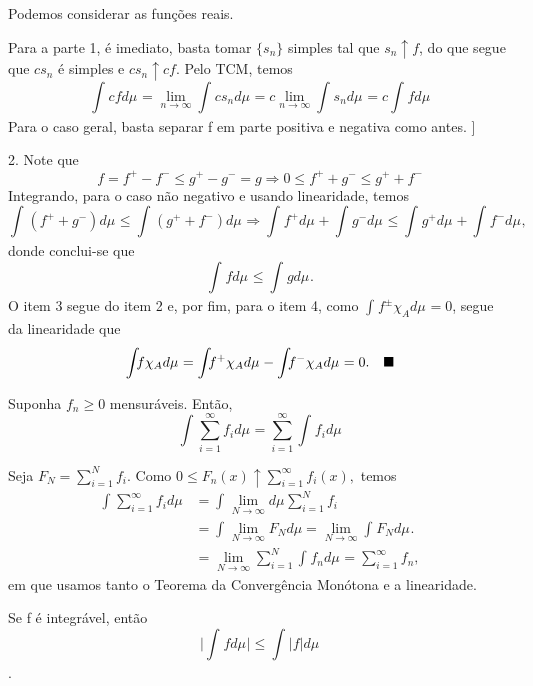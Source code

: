 \documentclass[measure_theory.tex]{subfiles}
\begin{document}
\begin{proof*}
	Podemos considerar as funções reais.

	Para a parte 1, é imediato, basta tomar \(\{s_{n}\}\) simples tal que \(s_{n}\uparrow f\), do que segue que \(cs_{n}\) é simples e \(cs_{n}\uparrow cf.\)
	Pelo TCM, temos
	\[
		\int_{}cf d\mu_{} = \lim_{n\to \infty}\int_{}cs_{n} d\mu_{} = c \lim_{n\to \infty}\int_{}s_{n} d\mu_{} = c \int_{}f d\mu_{}
	\]
	Para o caso geral, basta separar f em parte positiva e negativa como antes. ]

	2. Note que
	\[
		f = f^{+} - f^{-} \leq g^{+} - g^{-} = g \Rightarrow  0 \leq f^{+} + g^{-} \leq g^{+} + f^{-}
	\]
	Integrando, para o caso não negativo e usando linearidade, temos
	\[
		\int_{}(f^{+} + g^{-}) d\mu_{} \leq \int_{}(g^{+}+f^{-}) d\mu_{} \Rightarrow \int_{}f^{+} d\mu_{} + \int_{}g^{-} d\mu_{} \leq \int_{}g^{+} d\mu_{} + \int_{} f^{-} d\mu_{},
	\]
	donde conclui-se que
	\[
		\int_{}f d\mu_{} \leq \int_{}g d\mu_{}.
	\]
	O item 3 segue do item 2 e, por fim, para o item 4, como \(\int_{}f^{\pm}\chi_{A} d\mu_{} = 0\), segue da linearidade que
	\[
		\int_{}f \chi_{A} d\mu_{} = \int_{}f^{+}\chi_{A} d\mu_{} - \int_{}f^{-}\chi_{A} d\mu_{} = 0. \quad \text{$\blacksquare$}
	\]
\end{proof*}
\begin{prop*}
	Suponha \(f_{n}\geq 0\) mensuráveis. Então,
	\[
		\int_{}\sum\limits_{i=1}^{\infty}f_{i} d\mu_{} = \sum\limits_{i=1}^{\infty}\int_{}f_{i} d\mu_{}
	\]
\end{prop*}
\begin{proof*}
	Seja \(F_{N} = \sum\limits_{i=1}^{N}f_{i}.\) Como \(0 \leq F_{n}(x)\uparrow \sum\limits_{i=1}^{\infty}f_{i}(x),\) temos
	\begin{align*}
		\int_{}\sum\limits_{i=1}^{\infty}f_{i} d\mu_{} & = \int_{}\lim_{N\to \infty} d\mu_{} \sum\limits_{i=1}^{N}f_{i}                                   \\
		                                               & = \int_{}^{}\lim_{N\to \infty}F_{N}d\mu  = \lim_{N\to \infty}\int_{}F_{N} d\mu_{}.               \\
		                                               & = \lim_{N\to \infty}\sum\limits_{i=1}^{N}\int_{}f_{n} d\mu_{} = \sum\limits_{i=1}^{\infty}f_{n},
	\end{align*}
	em que usamos tanto o Teorema da Convergência Monótona e a linearidade. \qedsymbol
\end{proof*}
\begin{prop*}
	Se f é integrável, então
	\[
		\biggl\vert \int_{}f d\mu_{} \biggr\vert \leq \int_{}|f| d\mu_{}
	\].
\end{prop*}
\end{document}
